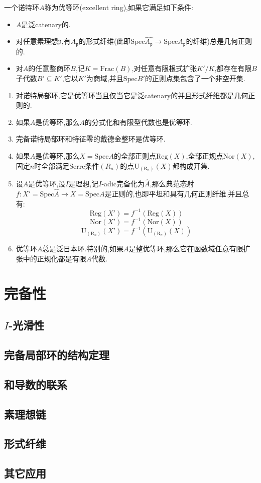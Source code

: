 一个诺特环$A$称为优等环(excellent ring),如果它满足如下条件:
\begin{itemize}
	\item $A$是泛catenary的.
	\item 对任意素理想$\mathfrak{p}$,有$A_{\mathfrak{p}}$的形式纤维(此即$\mathrm{Spec}\widehat{A_{\mathfrak{p}}}\to\mathrm{Spec}A_{\mathfrak{p}}$的纤维)总是几何正则的.
	\item 对$A$的任意整商环$B$,记$K=\mathrm{Frac}(B)$,对任意有限根式扩张$K'/K$,都存在有限$B$子代数$B'\subseteq K'$,它以$K'$为商域,并且$\mathrm{Spec}B'$的正则点集包含了一个非空开集.
\end{itemize}
\begin{enumerate}
	\item 对诺特局部环,它是优等环当且仅当它是泛catenary的并且形式纤维都是几何正则的.
	\item 如果$A$是优等环,那么$A$的分式化和有限型代数也是优等环.
	\item 完备诺特局部环和特征零的戴德金整环是优等环.
	\item 如果$A$是优等环,那么$X=\mathrm{Spec}A$的全部正则点$\mathrm{Reg}(X)$,全部正规点$\mathrm{Nor}(X)$,固定$n$时全部满足Serre条件$(R_n)$的点$\mathrm{U}_{(\mathrm{R}_n)}(X)$都构成开集.
	\item 设$A$是优等环,设$I$是理想,记$I$-adic完备化为$\widehat{A}$,那么典范态射$f:X'=\mathrm{Spec}\widehat{A}\to X=\mathrm{Spec}A$是正则的,也即平坦和具有几何正则纤维.并且总有:
	$$\mathrm{Reg}(X')=f^{-1}(\mathrm{Reg}(X))$$
	$$\mathrm{Nor}(X')=f^{-1}(\mathrm{Nor}(X))$$
	$$\mathrm{U}_{(\mathrm{R}_n)}(X')=f^{-1}(\mathrm{U}_{(\mathrm{R}_n)}(X))$$
	\item 优等环$A$总是泛日本环.特别的,如果$A$是整优等环,那么它在函数域任意有限扩张中的正规化都是有限$A$代数.
\end{enumerate}


\newpage
\section{完备性}
\subsection{$I$-光滑性}

\newpage
\subsection{完备局部环的结构定理}

\newpage
\subsection{和导数的联系}


\newpage
\subsection{素理想链}

\newpage
\subsection{形式纤维}


\newpage
\subsection{其它应用}








